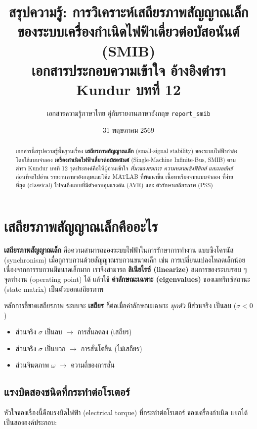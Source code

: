 \documentclass[12pt,a4paper]{article}
\title{\textbf{สรุปความรู้: การวิเคราะห์เสถียรภาพสัญญาณเล็ก\\
ของระบบเครื่องกำเนิดไฟฟ้าเดี่ยวต่อบัสอนันต์ (SMIB)}\\
\large เอกสารประกอบความเข้าใจ อ้างอิงตำรา Kundur บทที่ 12}
\author{เอกสารความรู้ภาษาไทย คู่กับรายงานภาษาอังกฤษ \texttt{report\_smib}}
\date{31 พฤษภาคม 2569}
\begin{document}
\maketitle
\thispagestyle{empty}

\begin{abstract}
\noindent
เอกสารนี้สรุปความรู้พื้นฐานเรื่อง \textbf{เสถียรภาพสัญญาณเล็ก}
(small-signal stability) ของระบบไฟฟ้ากำลัง โดยใช้แบบจำลอง
\textbf{เครื่องกำเนิดไฟฟ้าเดี่ยวต่อบัสอนันต์} (Single-Machine Infinite-Bus,
SMIB) ตามตำรา Kundur บทที่ 12 จุดประสงค์คือให้ผู้อ่านเข้าใจ
\emph{ที่มาของสมการ ความหมายเชิงฟิสิกส์ และผลลัพธ์} ก่อนที่จะไปอ่าน
รายงานภาษาอังกฤษและโค้ด MATLAB ที่พัฒนาขึ้น เนื้อหาเรียงจากแบบจำลอง
ที่ง่ายที่สุด (classical) ไปจนถึงแบบที่มีตัวควบคุมแรงดัน (AVR) และ
ตัวรักษาเสถียรภาพ (PSS)
\end{abstract}

\tableofcontents
\newpage

\section{เสถียรภาพสัญญาณเล็กคืออะไร}

\textbf{เสถียรภาพสัญญาณเล็ก} คือความสามารถของระบบไฟฟ้าในการรักษาการทำงาน
แบบซิงโครนัส (synchronism) เมื่อถูกรบกวนด้วยสัญญาณรบกวนขนาดเล็ก เช่น
การเปลี่ยนแปลงโหลดเล็กน้อย เนื่องจากการรบกวนมีขนาดเล็กมาก เราจึงสามารถ
\textbf{ลิเนียไรซ์ (linearize)} สมการของระบบรอบ ๆ จุดทำงาน (operating point)
ได้ แล้วใช้ \textbf{ค่าลักษณะเฉพาะ (eigenvalues)} ของเมทริกซ์สถานะ (state
matrix) เป็นตัวบอกเสถียรภาพ

\begin{keybox}{หลักการชี้ขาดเสถียรภาพ}
ระบบจะ \textbf{เสถียร} ก็ต่อเมื่อค่าลักษณะเฉพาะ \emph{ทุกตัว} มีส่วนจริง
เป็นลบ ($\sigma < 0$)
\begin{itemize}
  \item ส่วนจริง $\sigma$ เป็นลบ $\rightarrow$ การสั่นลดลง (เสถียร)
  \item ส่วนจริง $\sigma$ เป็นบวก $\rightarrow$ การสั่นโตขึ้น (ไม่เสถียร)
  \item ส่วนจินตภาพ $\omega$ $\rightarrow$ ความถี่ของการสั่น
\end{itemize}
\end{keybox}

\subsection{แรงบิดสองชนิดที่กระทำต่อโรเตอร์}

หัวใจของเรื่องนี้คือแรงบิดไฟฟ้า (electrical torque) ที่กระทำต่อโรเตอร์
ของเครื่องกำเนิด แยกได้เป็นสององค์ประกอบ:
\end{document}
